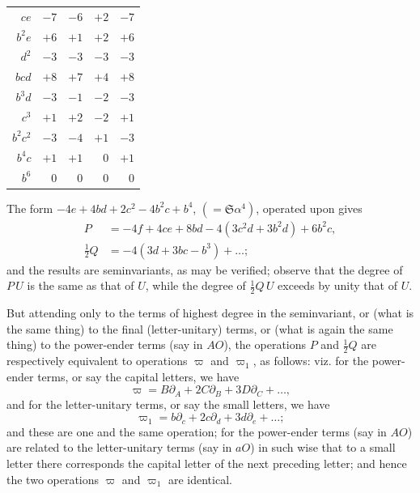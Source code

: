\documentclass[11pt,a4paper]{book}
\begin{document}
{{{\begin{art}
\begin{center}
\begin{tabular}{r|rrr|r}
$ce$ & $-7$ & $-6$ & $+2$ & $-7$ \\
$b^{2}e$ & $+6$ & $+1$ & $+2$ & $+6$ \\
$d^{2}$ & $-3$ & $-3$ & $-3$ & $-3$ \\
$bcd$ & $+8$ & $+7$ & $+4$ & $+8$ \\
$b^{3}d$ & $-3$ & $-1$ & $-2$ & $-3$ \\
$c^{3}$ & $+1$ & $+2$ & $-2$ & $+1$ \\
$b^{2}c^{2}$ & $-3$ & $-4$ & $+1$ & $-3$ \\
$b^{4}c$ & $+1$ & $+1$ & $0$ & $+1$ \\
$b^{6}$ & $0$ & $0$ & $0$ & $0$ \\
\end{tabular}
\end{center}
\end{art}

\setcounter{art}{31}
\begin{art}
The form $-4e + 4bd + 2c^{2} - 4b^{2}c + b^{4}$, $(= \mathfrak{S}\alpha^{4})$, operated upon gives
\begin{align*}
P &= -4f + 4ce + 8bd - 4(3c^{2}d + 3b^{2}d) + 6b^{2}c,\\
\tfrac{1}{2}Q &= -4(3d + 3bc - b^{3}) + \ldots;
\end{align*}
and the results are seminvariants, as may be verified; observe that the degree of $P\,U$ is the same as that of $U$, while the degree of $\frac{1}{2}Q\,U$ exceeds by unity that of $U$.
\end{art}

\setcounter{art}{32}
\begin{art}
But attending only to the terms of highest degree in the seminvariant, or (what is the same thing) to the final (letter-unitary) terms, or (what is again the same thing) to the power-ender terms (say in $AO$), the operations $P$ and $\frac{1}{2}Q$ are respectively equivalent to operations $\varpi$ and $\varpi_{1}$, as follows: viz. for the power-ender terms, or say the capital letters, we have
\[
\varpi = B\partial_{A} + 2C\partial_{B} + 3D\partial_{C} + \ldots,
\]
and for the letter-unitary terms, or say the small letters, we have
\[
\varpi_{1} = b\partial_{c} + 2c\partial_{d} + 3d\partial_{e} + \ldots;
\]
and these are one and the same operation; for the power-ender terms (say in $AO$) are related to the letter-unitary terms (say in $aO$) in such wise that to a small letter there corresponds the capital letter of the next preceding letter; and hence the two operations $\varpi$ and $\varpi_{1}$ are identical.
\end{art}

}}}
\end{document}
